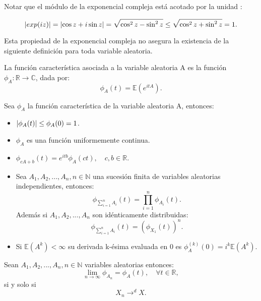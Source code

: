 \documentclass[../proyecto.tex]{memoir}
\begin{document}
Notar que el módulo de la exponencial compleja está acotado por la unidad :

$$
\abs{ exp(iz) } = \abs{\cos z+i\sin z} = \sqrt{\cos^2 z - \sin^2 z} \leq \sqrt{\cos^2 z + \sin^2 z} = 1.
$$

Esta propiedad de la exponencial compleja no asegura la existencia de la siguiente definición para toda variable aleatoria.

\begin{defi}
La función característica asociada a la variable aleatoria A es la función $\phi_{A}: \mathds{R} \to \mathds{C}$, dada por:
$$
\phi_{A}(t) = \mathds{E}(e^{itA}).
$$
\end{defi}


\begin{prop}
Sea $\phi_A$ la función característica de la variable aleatoria A, entonces:

\begin{itemize}
\item $\abs{\phi_A(t)} \leq \phi_A(0)=1$.
\item $\phi_A$ es una función uniformemente continua.
\item $\phi_{cA+b}(t)=e^{itb}\phi_A(ct), \quad c,b\in \mathds{R}$.
\item Sea $A_1, A_2,...,A_n, n\in\mathds{N}$ una sucesión finita de variables aleatorias independientes, entonces: $$ 
\phi_{\sum^{n}_{i=1} A_i} (t) = \prod_{i=1}^{n} \phi_{A_i} (t) .
$$ Además si $A_1, A_2,...,A_n$ son idénticamente distribuidas: $$
\phi_{\sum^{n}_{i=1} A_i} (t) = \left( \phi_{X_1}(t) \right)^{n}.
$$
\item Si $\mathds{E}(A^k) < \infty$ su derivada k-ésima evaluada en 0 es $\phi_A^{(k)}(0)=i^k\mathds{E}(A^k)$.
\end{itemize}

\end{prop}

\begin{teorema}
Sean $A_1, A_2,...,A_n, n\in\mathds{N}$ variables aleatorias entonces: $$
\lim_{n \to \infty }{\phi_{A_n}} = \phi_{A}(t), \quad \forall t\in \mathds{R},
$$
si y solo si $$
X_n \to^d X.
$$

\end{teorema}
\end{document}
